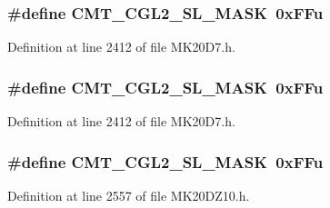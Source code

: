 \subsubsection[{\texorpdfstring{C\+M\+T\+\_\+\+C\+G\+L2\+\_\+\+S\+L\+\_\+\+M\+A\+SK}{CMT_CGL2_SL_MASK}}]{\setlength{\rightskip}{0pt plus 5cm}\#define C\+M\+T\+\_\+\+C\+G\+L2\+\_\+\+S\+L\+\_\+\+M\+A\+SK~0x\+F\+Fu}\hypertarget{group___c_m_t___register___masks_gafd7f251bad02bcf7549874db413adcf9}{}\label{group___c_m_t___register___masks_gafd7f251bad02bcf7549874db413adcf9}


Definition at line 2412 of file M\+K20\+D7.\+h.

\subsubsection[{\texorpdfstring{C\+M\+T\+\_\+\+C\+G\+L2\+\_\+\+S\+L\+\_\+\+M\+A\+SK}{CMT_CGL2_SL_MASK}}]{\setlength{\rightskip}{0pt plus 5cm}\#define C\+M\+T\+\_\+\+C\+G\+L2\+\_\+\+S\+L\+\_\+\+M\+A\+SK~0x\+F\+Fu}\hypertarget{group___c_m_t___register___masks_gafd7f251bad02bcf7549874db413adcf9}{}\label{group___c_m_t___register___masks_gafd7f251bad02bcf7549874db413adcf9}


Definition at line 2412 of file M\+K20\+D7.\+h.

\subsubsection[{\texorpdfstring{C\+M\+T\+\_\+\+C\+G\+L2\+\_\+\+S\+L\+\_\+\+M\+A\+SK}{CMT_CGL2_SL_MASK}}]{\setlength{\rightskip}{0pt plus 5cm}\#define C\+M\+T\+\_\+\+C\+G\+L2\+\_\+\+S\+L\+\_\+\+M\+A\+SK~0x\+F\+Fu}\hypertarget{group___c_m_t___register___masks_gafd7f251bad02bcf7549874db413adcf9}{}\label{group___c_m_t___register___masks_gafd7f251bad02bcf7549874db413adcf9}


Definition at line 2557 of file M\+K20\+D\+Z10.\+h.


